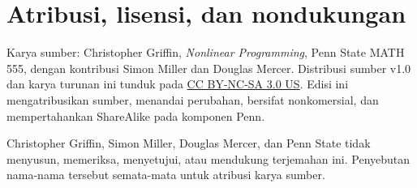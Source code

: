 \documentclass[a4paper,openany,leqno,fleqn,12pt]{amsbook}
\numberwithin{equation}{chapter}
\numberwithin{figure}{chapter}
\theoremstyle{definition}
\theoremstyle{remark}
\begin{document}
\chapter*{Atribusi, lisensi, dan nondukungan}
Karya sumber: Christopher Griffin, \emph{Nonlinear Programming}, Penn State
MATH 555, dengan kontribusi Simon Miller dan Douglas Mercer. Distribusi sumber
v1.0 dan karya turunan ini tunduk pada
\href{https://creativecommons.org/licenses/by-nc-sa/3.0/us/}
{CC BY-NC-SA 3.0 US}. Edisi ini mengatribusikan sumber, menandai perubahan,
bersifat nonkomersial, dan mempertahankan ShareAlike pada komponen Penn.

Christopher Griffin, Simon Miller, Douglas Mercer, dan Penn State tidak
menyusun, memeriksa, menyetujui, atau mendukung terjemahan ini. Penyebutan
nama-nama tersebut semata-mata untuk atribusi karya sumber.
\end{document}
